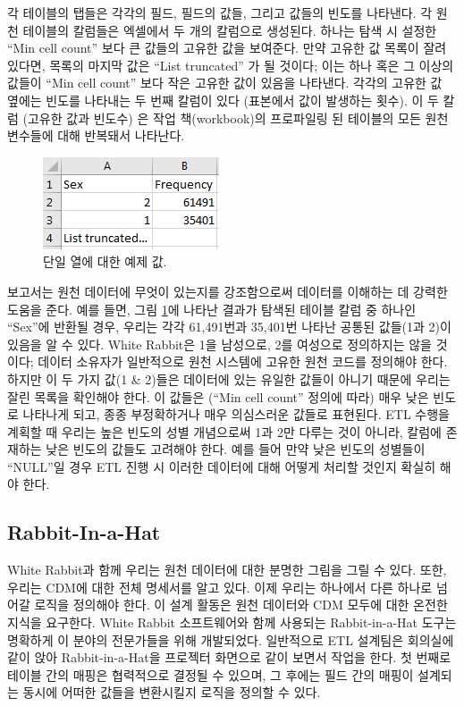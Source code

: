 \documentclass[11pt]{book}
\theoremstyle{definition}
\theoremstyle{definition}
\theoremstyle{definition}
\theoremstyle{remark}
\begin{document}
각 테이블의 탭들은 각각의 필드, 필드의 값들, 그리고 값들의 빈도를
나타낸다. 각 원천 테이블의 칼럼들은 엑셀에서 두 개의 칼럼으로 생성된다.
하나는 탐색 시 설정한 ``Min cell count'' 보다 큰 값들의 고유한 값을
보여준다. 만약 고유한 값 목록이 잘려있다면, 목록의 마지막 값은 ``List
truncated'' 가 될 것이다; 이는 하나 혹은 그 이상의 값들이 ``Min cell
count'' 보다 작은 고유한 값이 있음을 나타낸다. 각각의 고유한 값 옆에는
빈도를 나타내는 두 번째 칼럼이 있다 (표본에서 값이 발생하는 횟수). 이 두
칼럼 (고유한 값과 빈도수) 은 작업 책(workbook)의 프로파일링 된 테이블의
모든 원천 변수들에 대해 반복돼서 나타난다.

\begin{figure}

{\centering \includegraphics[width=0.3\linewidth]{images/ExtractTransformLoad/ScanSex} 

}

\caption{단일 열에 대한 예제 값.}\label{fig:scanSex}
\end{figure}

보고서는 원천 데이터에 무엇이 있는지를 강조함으로써 데이터를 이해하는 데
강력한 도움을 준다. 예를 들면, 그림 \ref{fig:scanSex}에 나타난 결과가
탐색된 테이블 칼럼 중 하나인 ``Sex''에 반환될 경우, 우리는 각각
61,491번과 35,401번 나타난 공통된 값들(1과 2)이 있음을 알 수 있다. White
Rabbit은 1을 남성으로, 2를 여성으로 정의하지는 않을 것이다; 데이터
소유자가 일반적으로 원천 시스템에 고유한 원천 코드를 정의해야 한다.
하지만 이 두 가지 값(1 \& 2)들은 데이터에 있는 유일한 값들이 아니기
때문에 우리는 잘린 목록을 확인해야 한다. 이 값들은 (``Min cell count''
정의에 따라) 매우 낮은 빈도로 나타나게 되고, 종종 부정확하거나 매우
의심스러운 값들로 표현된다. ETL 수행을 계획할 때 우리는 높은 빈도의 성별
개념으로써 1과 2만 다루는 것이 아니라, 칼럼에 존재하는 낮은 빈도의
값들도 고려해야 한다. 예를 들어 만약 낮은 빈도의 성별들이 ``NULL''일
경우 ETL 진행 시 이러한 데이터에 대해 어떻게 처리할 것인지 확실히 해야
한다.

\subsection{Rabbit-In-a-Hat}\label{rabbit-in-a-hat}

White Rabbit과 함께 우리는 원천 데이터에 대한 분명한 그림을 그릴 수
있다. 또한, 우리는 CDM에 대한 전체 명세서를 알고 있다. 이제 우리는
하나에서 다른 하나로 넘어갈 로직을 정의해야 한다. 이 설계 활동은 원천
데이터와 CDM 모두에 대한 온전한 지식을 요구한다. White Rabbit
소프트웨어와 함께 사용되는 Rabbit-in-a-Hat 도구는 명확하게 이 분야의
전문가들을 위해 개발되었다. 일반적으로 ETL 설계팀은 회의실에 같이 앉아
Rabbit-in-a-Hat을 프로젝터 화면으로 같이 보면서 작업을 한다. 첫 번째로
테이블 간의 매핑은 협력적으로 결정될 수 있으며, 그 후에는 필드 간의
매핑이 설계되는 동시에 어떠한 값들을 변환시킬지 로직을 정의할 수 있다.
 
\end{document}
